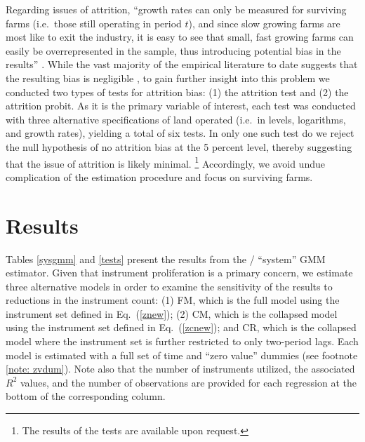 \documentclass[english]{article}
\begin{document}
Regarding issues of attrition, ``growth rates can only be measured for 
surviving farms (i.e.\ those still operating in period $t$), and since slow 
growing farms are most like to exit the industry, it is easy to see that small, 
fast growing farms can easily be overrepresented in the sample, thus 
introducing potential bias in the results'' \citep[pg.\ 790]{bakucs2009}. 
While the vast majority of the empirical literature to date suggests that the 
resulting bias is negligible \citep{evans1987, hall1987, weiss1999, dries2004},
to gain further insight into this problem we conducted two types of tests for
attrition bias: (1) the \citet{becketti1988} attrition test and (2) the 
\citet{fitzgerald1998} attrition probit.
As it is the primary variable of interest, each test was conducted with three 
alternative specifications of land operated (i.e.\ in levels, logarithms, and 
growth rates), yielding a total of six tests.
In only one such test do we reject the null hypothesis of no attrition bias at 
the 5 percent level, thereby suggesting that the issue of attrition is likely 
minimal.%
\footnote{The results of the tests are available upon request.}
Accordingly, we avoid undue complication of the estimation procedure 
and focus on surviving farms.


\section{Results}
\label{sec: results}

Tables \ref{sysgmm} and \ref{tests} present the results from the 
\citet{arellano1995}/\citet{blundell1998} ``system'' GMM estimator. 
Given that instrument proliferation is a primary concern, we estimate 
three alternative models in order to examine the sensitivity of the results 
to reductions in the instrument count: (1) FM, which is the full model using 
the instrument set defined in Eq.\ (\ref{znew}); (2) CM, which is the 
collapsed model using the instrument set defined in Eq.\ (\ref{zcnew}); 
and CR, which is the collapsed model where the instrument set is further 
restricted to only two-period lags.
Each model is estimated with a full set of time and ``zero value'' dummies 
(see footnote \ref{note: zvdum}).
Note also that the number of instruments utilized, the associated $R^2$ values, 
and the number of observations are provided for each regression at the 
bottom of the corresponding column. 
\end{document}
